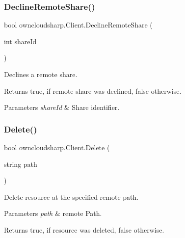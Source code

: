 \subsubsection{\texorpdfstring{Decline\+Remote\+Share()}{DeclineRemoteShare()}}
{\footnotesize\ttfamily bool owncloudsharp.\+Client.\+Decline\+Remote\+Share (\begin{DoxyParamCaption}\item[{int}]{share\+Id }\end{DoxyParamCaption})}



Declines a remote share. 

\begin{DoxyReturn}{Returns}
{\ttfamily true}, if remote share was declined, {\ttfamily false} otherwise.
\end{DoxyReturn}

\begin{DoxyParams}{Parameters}
{\em share\+Id} & Share identifier.\\
\hline
\end{DoxyParams}
\mbox{\label{classowncloudsharp_1_1_client_a6465df479d098af428bc9bcdd2edbc7f}} 
\subsubsection{\texorpdfstring{Delete()}{Delete()}}
{\footnotesize\ttfamily bool owncloudsharp.\+Client.\+Delete (\begin{DoxyParamCaption}\item[{string}]{path }\end{DoxyParamCaption})}



Delete resource at the specified remote path. 


\begin{DoxyParams}{Parameters}
{\em path} & remote Path.\\
\hline
\end{DoxyParams}
\begin{DoxyReturn}{Returns}
{\ttfamily true}, if resource was deleted, {\ttfamily false} otherwise.
\end{DoxyReturn}
\mbox{\label{classowncloudsharp_1_1_client_ad94e83b297c9de310beafd878fd99bc4}} 
